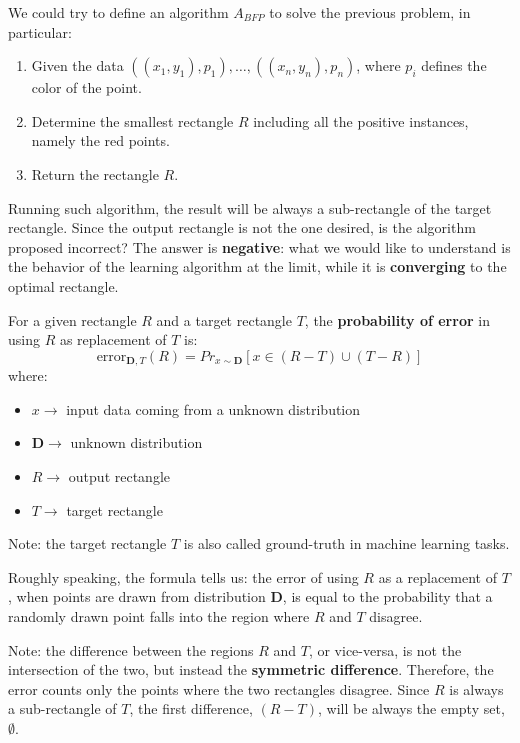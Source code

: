 We could try to define an algorithm $A_{BFP}$ to solve the previous problem, in particular:
\begin{enumerate}
    \item Given the data $((x_1, y_1), p_1), \dots, ((x_n, y_n), p_n)$, where $p_i$ defines the color of the point.
    \item Determine the smallest rectangle $R$ including all the positive instances, namely the red points.
    \item Return the rectangle $R$.
\end{enumerate}
Running such algorithm, the result will be always a sub-rectangle of the target rectangle. Since the output rectangle is not the one desired, is the algorithm 
proposed incorrect? The answer is \textbf{negative}: what we would like to understand is the behavior of the learning algorithm at the limit, while it is 
\textbf{converging} to the optimal rectangle. \vspace{7pt}

For a given rectangle $R$ and a target rectangle $T$, the \textbf{probability of error} in using $R$ as replacement of $T$ is:
$$\text{error}_{\boldsymbol{D},T}(R) = Pr_{x \sim \boldsymbol{D}}[x \in (R-T) \cup (T-R)]$$
where:
\begin{itemize}
    \renewcommand{\labelitemi}{-}
    \item $x \rightarrow$ input data coming from a unknown distribution
    \item $\boldsymbol{D} \rightarrow$ unknown distribution 
    \item $R \rightarrow$ output rectangle
    \item $T \rightarrow$ target rectangle
\end{itemize} \vspace{7pt}

Note: the target rectangle $T$ is also called ground-truth in machine learning tasks.

Roughly speaking, the formula tells us: the error of using $R$ as a replacement of $T$, when points are drawn from distribution $\boldsymbol{D}$, is equal to the probability 
that a randomly drawn point falls into the region where $R$ and $T$ disagree. \vspace{7pt}

Note: the difference between the regions $R$ and $T$, or vice-versa, is not the intersection of the two, but instead the \textbf{symmetric difference}. Therefore, the 
error counts only the points where the two rectangles disagree. Since $R$ is always a sub-rectangle of $T$, the first difference, $(R-T)$, will be always the 
empty set, $\emptyset$. \vspace{7pt}

